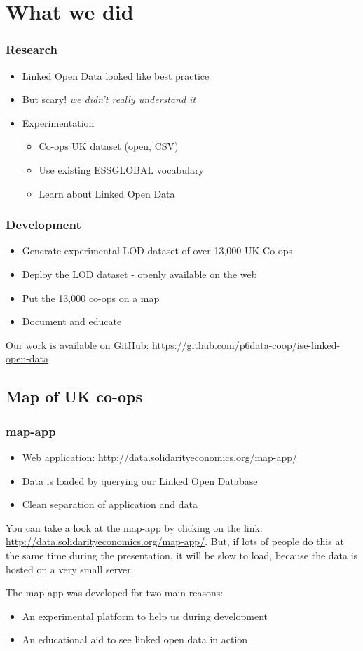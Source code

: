 \section{What we did}
\frame
{
  \frametitle{Research}
  \begin{itemize}
    \item Linked Open Data looked like best practice
    \item But scary! {\em we didn't really understand it}
    \item Experimentation
      \begin{itemize}
	\item Co-ops UK dataset (open, CSV)
	\item Use existing ESSGLOBAL vocabulary
	\item Learn about Linked Open Data
      \end{itemize}
  \end{itemize}
}
\frame
{
  \frametitle{Development}
  \begin{itemize}
    \item Generate experimental LOD dataset of over 13,000 UK Co-ops
    \item Deploy the LOD dataset - openly available on the web
    \item Put the 13,000 co-ops on a map
    \item Document and educate
  \end{itemize}
}
Our work is available on GitHub: \url{https://github.com/p6data-coop/ise-linked-open-data}
\subsection{Map of UK co-ops}
\frame
{
  \frametitle{map-app}
  \begin{itemize}
    \item Web application: \url{http://data.solidarityeconomics.org/map-app/}
    \item Data is loaded by querying our Linked Open Database
    \item Clean separation of application and data
  \end{itemize}
}

You can take a look at the map-app by clicking on the link: \url{http://data.solidarityeconomics.org/map-app/}.
But, if lots of people do this at the same time during the presentation, it will be slow to load, because the data is hosted on a very small server.

The map-app was developed for two main reasons:
  \begin{itemize}
    \item An experimental platform to help us during development
    \item An educational aid to see linked open data in action 
  \end{itemize}

